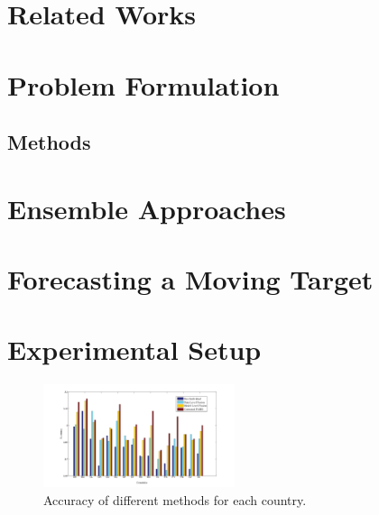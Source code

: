 \documentclass[twoside,leqno,twocolumn]{article}
\begin{document}
\vspace{-1em}
\section{\label{sec:related}Related Works}


\vspace{-1em}
\section{\label{sec:problem} Problem Formulation}

 
\vspace{-1em}
\subsection{\label{sec:methods} Methods}


\vspace{-1em}
\section{\label{sec:ensemble} Ensemble Approaches}


\vspace{-1em}
\section{\label{sec:moving} Forecasting a Moving Target}


\vspace{-1em}
\section{\label{sec:experiments} Experimental Setup}


\begin{figure}[H]
\centering
\captionsetup{font=scriptsize}
\includegraphics[width=0.5\textwidth]{fig/accs}
\caption{Accuracy of different methods for each country.}
\label{fig:accuracies}
\end{figure}
\end{document}
